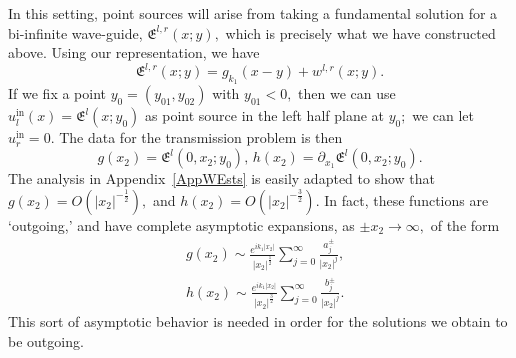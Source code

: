 \documentclass[11pt]{article}
\newcommand\In{\operatorname{in}}
\newcommand\fE{\mathfrak E}
\newcommand\pa{\partial}
\theoremstyle{definition}
\theoremstyle{remark}
\begin{document}
In this setting, point sources will arise from taking a fundamental solution for a
bi-infinite wave-guide, $\fE^{l,r}(x;y),$ which is precisely what we have constructed
above. Using our representation, we have
\begin{equation}
  \fE^{l,r}(x;y)=g_{k_1}(x-y)+w^{l,r}(x;y).
\end{equation}
If we fix a point $y_0=(y_{01},y_{02})$ with $y_{01}<0,$ then we can use
$u^{\In}_l(x)=\fE^l(x;y_0)$ as point source in the left half plane at $y_0;$ we
can let $u^{\In}_r=0.$ The data for the transmission problem
is then
  \begin{equation}
    g(x_2)=\fE^{l}(0,x_2;y_0),\, h(x_2)=\pa_{x_1}\fE^{l}(0,x_2;y_0).
  \end{equation}
  The analysis in Appendix~\ref{AppWEsts}  is easily adapted to show that
  $g(x_2)=O(|x_2|^{-\frac 12}), $ and $h(x_2)=O(|x_2|^{-\frac 32}).$ In fact, these
  functions are `outgoing,' and have complete asymptotic expansions, as $\pm
  x_2\to\infty,$ of the form
  \begin{equation}
    \begin{split}
      &g(x_2)\sim
      \frac{e^{ik_1|x_2|}}{|x_2|^{\frac 12}}\sum_{j=0}^{\infty}\frac{a_j^{\pm}}{|x_2|^{j}},\\
        &h(x_2)\sim \frac{e^{ik_1|x_2|}}{|x_2|^{\frac 32}}\sum_{j=0}^{\infty}\frac{b_j^{\pm}}{|x_2|^{j}}.
    \end{split}
  \end{equation}
  This sort of asymptotic behavior is needed in order for the solutions we
  obtain to be outgoing. 
  
\end{document}
